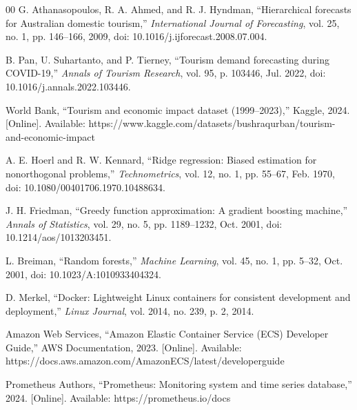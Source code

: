 \documentclass[conference]{IEEEtran}
\begin{document}
\begin{thebibliography}{00}
G. Athanasopoulos, R. A. Ahmed, and R. J. Hyndman,
``Hierarchical forecasts for Australian domestic tourism,''
\textit{International Journal of Forecasting},
vol. 25, no. 1, pp. 146--166, 2009,
doi: 10.1016/j.ijforecast.2008.07.004.

B. Pan, U. Suhartanto, and P. Tierney,
``Tourism demand forecasting during COVID-19,''
\textit{Annals of Tourism Research}, vol. 95, p. 103446,
Jul. 2022, doi: 10.1016/j.annals.2022.103446.

World Bank,
``Tourism and economic impact dataset (1999--2023),''
Kaggle, 2024. [Online]. Available:
https://www.kaggle.com/datasets/bushraqurban/tourism-and-economic-impact

A. E. Hoerl and R. W. Kennard,
``Ridge regression: Biased estimation for nonorthogonal
problems,''
\textit{Technometrics}, vol. 12, no. 1, pp. 55--67,
Feb. 1970, doi: 10.1080/00401706.1970.10488634.

J. H. Friedman,
``Greedy function approximation: A gradient boosting
machine,''
\textit{Annals of Statistics}, vol. 29, no. 5,
pp. 1189--1232, Oct. 2001, doi: 10.1214/aos/1013203451.

L. Breiman,
``Random forests,''
\textit{Machine Learning}, vol. 45, no. 1, pp. 5--32,
Oct. 2001, doi: 10.1023/A:1010933404324.

D. Merkel,
``Docker: Lightweight Linux containers for consistent
development and deployment,''
\textit{Linux Journal}, vol. 2014, no. 239, p. 2, 2014.

Amazon Web Services,
``Amazon Elastic Container Service (ECS) Developer Guide,''
AWS Documentation, 2023. [Online]. Available:
https://docs.aws.amazon.com/AmazonECS/latest/developerguide

Prometheus Authors,
``Prometheus: Monitoring system and time series database,''
2024. [Online]. Available: https://prometheus.io/docs

\end{thebibliography}
\end{document}
